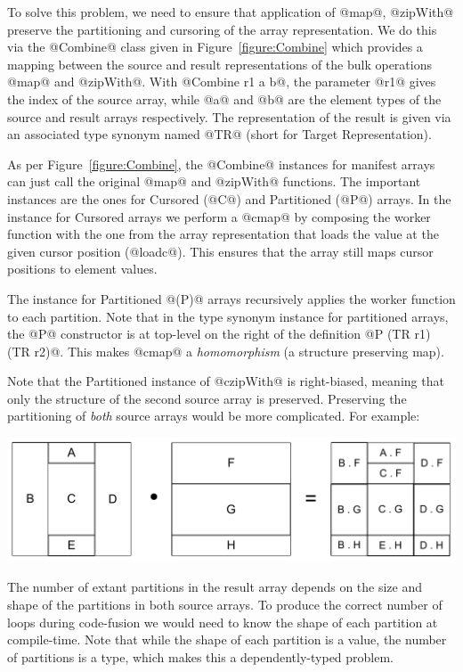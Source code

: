 To solve this problem, we need to ensure that application of @map@, @zipWith@ preserve the partitioning and cursoring of the array representation. We do this via the @Combine@ class given in Figure~\ref{figure:Combine} which provides a mapping between the source and result representations of the bulk operations @map@ and @zipWith@. With @Combine r1 a b@, the parameter @r1@ gives the index of the source array, while @a@ and @b@ are the element types of the source and result arrays respectively. The representation of the result is given via an associated type synonym \cite{Chakravarty:AssocTypeSynonyms} 
named @TR@ (short for Target Representation). 

As per Figure~\ref{figure:Combine}, the @Combine@ instances for manifest arrays can just call the original @map@ and @zipWith@ functions. The important instances are the ones for Cursored (@C@) and Partitioned (@P@) arrays. In the instance for Cursored arrays we perform a @cmap@ by composing the worker function with the one from the array representation that loads the value at the given cursor position (@loadc@). This ensures that the array still maps cursor positions to element values. 

The instance for Partitioned @(P)@ arrays recursively applies the worker function to each partition. Note that in the type synonym instance for partitioned arrays, the @P@ constructor is at top-level on the right of the definition @P (TR r1) (TR r2)@. This makes @cmap@ a \emph{homomorphism} (a structure preserving map).

Note that the Partitioned instance of @czipWith@ is right-biased, meaning that only the structure of the second source array is preserved. Preserving the partitioning of \emph{both} source arrays would be more complicated. For example:
%
\begin{center}
\includegraphics[scale=0.3]{figs/guiding-zipwith-partitions.pdf}
\end{center}
%
The number of extant partitions in the result array depends on the size and shape of the partitions in both source arrays. To produce the correct number of loops during code-fusion we would need to know the shape of each partition at compile-time. Note that while the shape of each partition is a value, the number of partitions is a type, which makes this a dependently-typed problem. 

